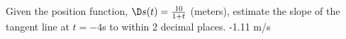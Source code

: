 {Given the position function, $\D s(t)=\frac{10}{1+t}$ (meters), estimate the slope of the tangent line at $t=-4$s to within 2 decimal places.}
{-1.11 m/s}